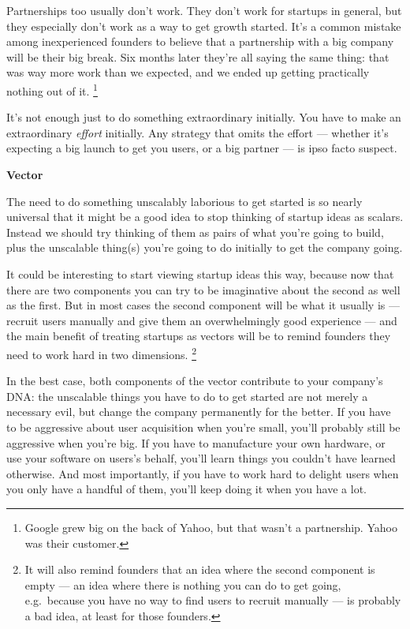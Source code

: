 \documentclass[12pt]{book}
\begin{document}
Partnerships too usually don't work. They don't work for startups in
general, but they especially don't work as a way to get growth started.
It's a common mistake among inexperienced founders to believe that a
partnership with a big company will be their big break. Six months later
they're all saying the same thing: that was way more work than we
expected, and we ended up getting practically nothing out of it.
\footnote{Google grew big on the back of Yahoo, but that wasn't a
partnership. Yahoo was their customer.}

It's not enough just to do something extraordinary initially. You have
to make an extraordinary \emph{effort} initially. Any strategy that
omits the effort --- whether it's expecting a big launch to get you
users, or a big partner --- is ipso facto suspect.

\textbf{Vector}

The need to do something unscalably laborious to get started is so
nearly universal that it might be a good idea to stop thinking of
startup ideas as scalars. Instead we should try thinking of them as
pairs of what you're going to build, plus the unscalable thing(s) you're
going to do initially to get the company going.

It could be interesting to start viewing startup ideas this way, because
now that there are two components you can try to be imaginative about
the second as well as the first. But in most cases the second component
will be what it usually is --- recruit users manually and give them an
overwhelmingly good experience --- and the main benefit of treating
startups as vectors will be to remind founders they need to work hard in
two dimensions. \footnote{It will also remind founders that an idea where the second
component is empty --- an idea where there is nothing you can do to get
going, e.g.~because you have no way to find users to recruit manually
--- is probably a bad idea, at least for those founders.}

In the best case, both components of the vector contribute to your
company's DNA: the unscalable things you have to do to get started are
not merely a necessary evil, but change the company permanently for the
better. If you have to be aggressive about user acquisition when you're
small, you'll probably still be aggressive when you're big. If you have
to manufacture your own hardware, or use your software on users's
behalf, you'll learn things you couldn't have learned otherwise. And
most importantly, if you have to work hard to delight users when you
only have a handful of them, you'll keep doing it when you have a lot.
\end{document}
